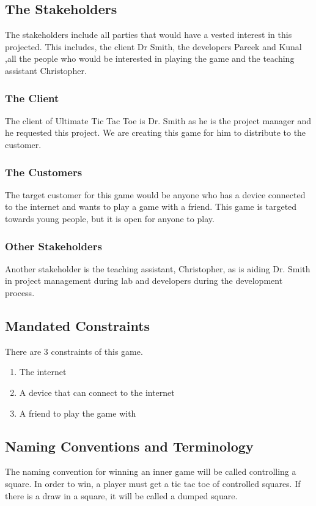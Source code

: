 \documentclass[12pt, titlepage]{article}
\begin{document}
\subsection{The Stakeholders}

The stakeholders include all parties that would have a vested interest in this
projected. This includes, the client Dr Smith, the developers Pareek and
Kunal ,all the people who would be interested in playing the game and the
teaching assistant Christopher.


\subsubsection{The Client}
The client of Ultimate Tic Tac Toe is Dr. Smith as he is the project manager and 
he requested this project. We are creating this game for him to distribute to 
the customer.

\subsubsection{The Customers}
The target customer for this game would be anyone who has a device connected to
the internet and wants to play a game with a friend. This game is targeted
towards young people, but it is open for anyone to play.

\subsubsection{Other Stakeholders}
Another stakeholder is the teaching assistant, Christopher, as is aiding Dr.
Smith in project management during lab and developers during the development 
process.

\subsection{Mandated Constraints}
There are 3 constraints of this game.	
\begin{enumerate}
	\item The internet
  	\item A device that can connect to the internet
  	\item A friend to play the game with
\end{enumerate}

\subsection{Naming Conventions and Terminology}
The naming convention for winning an inner game will be called controlling a
square. In order to win, a player must get a tic tac toe of controlled squares.
If there is a draw in a square, it will be called a dumped square.
\end{document}
